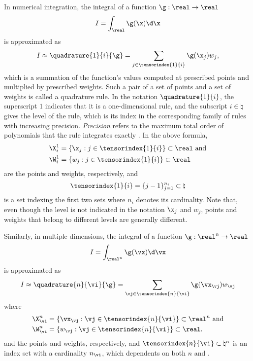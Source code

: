 In numerical integration, the integral of a function $\g: \real \to \real$
\[
  I = \int_\real \g(\x) \d \x
\]
is approximated as
\[
  I \approx \quadrature{1}{i}{\g} = \sum_{j \in \tensorindex{1}{i}} \g(\x_j) w_j,
\]
which is a summation of the function's values computed at prescribed points and
multiplied by prescribed weights. Such a pair of a set of points and a set of
weights is called a quadrature rule. In the notation $\quadrature{1}{i}$, the
superscript $1$ indicates that it is a one-dimensional rule, and the subscript
$i \in \natural$ gives the level of the rule, which is its index in the
corresponding family of rules with increasing precision. \emph{Precision} refers
to the maximum total order of polynomials that the rule integrates exactly
\cite{heiss2008}. In the above formula,
\[
  \begin{split}
    & \X^1_i = \{ \x_j: j \in \tensorindex{1}{i} \} \subset \real \text{ and} \\
    & \W^1_i = \{ w_j: j \in \tensorindex{1}{i} \} \subset \real
  \end{split}
\]
are the points and weights, respectively, and
\[
  \tensorindex{1}{i} = \{ j - 1 \}_{j = 1}^{n_i} \subset \natural
\]
is a set indexing the first two sets where $n_i$ denotes its cardinality. Note
that, even though the level is not indicated in the notation $\x_j$ and $w_j$,
points and weights that belong to different levels are generally different.

Similarly, in multiple dimensions, the integral of a function $\g: \real^n \to
\real$
\[
  I = \int_{\real^n} \g(\vx) \d \vx
\]
is approximated as
\[
  I \approx \quadrature{n}{\vi}{\g} = \sum_{\vj \in \tensorindex{n}{\vi}} \g(\vx_{\vj}) w_{\vj}
\]
where
\[
  \begin{split}
    & \X^n_{\vi} = \{ \vx_{\vj}: \vj \in \tensorindex{n}{\vi} \} \subset \real^n \text{ and} \\
    & \W^n_{\vi} = \{ w_{\vj}: \vj \in \tensorindex{n}{\vi} \} \subset \real. \\
  \end{split}
\]
and the points and weights, respectively, and $\tensorindex{n}{\vi} \subset
\natural^n$ is an index set with a cardinality $n_{\vi}$, which dependents on
both $n$ and \vi.


